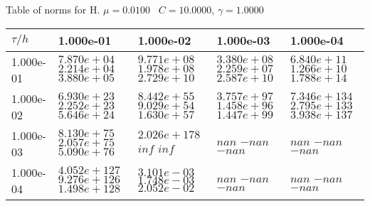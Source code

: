 \begin{center}
Table of norms for H. $\mu = 0.0100$ \, $C = 10.0000$, $\gamma = 1.0000$
  
\begin{tabular}{|p{1in}|p{1in}|p{1in}|p{1in}|p{1in}|} \hline
$\tau / h$ &1.000e-01 &1.000e-02 &1.000e-03 &1.000e-04 \\ \hline 
1.000e-01 & $7.870e+04$  $2.214e+04$  $3.880e+05$  & $9.771e+08$  $1.978e+08$  $2.729e+10$  & $3.380e+08$  $2.259e+07$  $2.587e+10$  & $6.840e+11$  $1.266e+10$  $1.788e+14$  \\ \hline 
1.000e-02 & $6.930e+23$  $2.252e+23$  $5.646e+24$  & $8.442e+55$  $9.029e+54$  $1.630e+57$  & $3.757e+97$  $1.458e+96$  $1.447e+99$  & $7.346e+134$  $2.795e+133$  $3.938e+137$  \\ \hline 
1.000e-03 & $8.130e+75$  $2.057e+75$  $5.090e+76$  & $2.026e+178$  $inf$  $inf$  & $nan$  $-nan$  $-nan$  & $nan$  $-nan$  $-nan$  \\ \hline 
1.000e-04 & $4.052e+127$  $9.276e+126$  $1.498e+128$  & $3.101e-03$  $1.748e-03$  $2.052e-02$  & $nan$  $-nan$  $-nan$  & $nan$  $-nan$  $-nan$  \\ \hline 

\end{tabular}\\[20pt]
\end{center}
